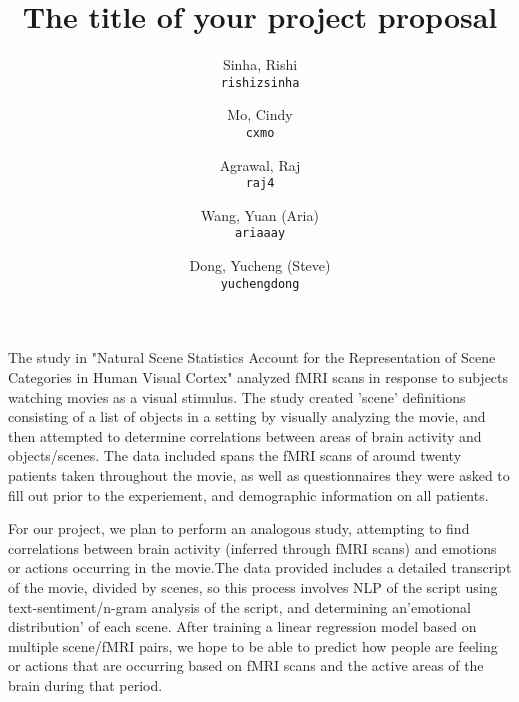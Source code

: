\documentclass[11pt]{article}
\title{The title of your project proposal}
\author{
  Sinha, Rishi\\
  \texttt{rishizsinha}
  \and
  Mo, Cindy\\
  \texttt{cxmo}
  \and
  Agrawal, Raj\\
  \texttt{raj4}
  \and
  Wang, Yuan (Aria)\\
  \texttt{ariaaay}
  \and
  Dong, Yucheng (Steve)\\
  \texttt{yuchengdong}
}
\begin{document}
\maketitle

The study in "Natural Scene Statistics Account for the Representation of 
Scene Categories in Human Visual Cortex"\cite{stansbury2013neuron} analyzed 
fMRI scans in response to subjects watching movies as a visual stimulus.
The study created 'scene' definitions consisting of a list of objects in 
a setting by visually analyzing the movie, and then attempted to determine 
correlations between areas of brain activity and objects/scenes. The data 
included spans the fMRI scans of around twenty patients taken throughout
the movie, as well as questionnaires they were asked to fill out prior
to the experiement, and demographic information on all patients.

For our project, we plan to perform an analogous study, attempting to find
correlations between brain activity (inferred through fMRI scans) and 
emotions or actions occurring in the movie.The data provided includes 
a detailed transcript of the movie, divided by scenes, so this process 
involves NLP of the script using text-sentiment/n-gram analysis of the 
script, and determining an'emotional distribution' of each scene. After 
training a linear regression model based on multiple scene/fMRI pairs, we 
hope to be able to predict how people are feeling or actions that are 
occurring based on fMRI scans and the active areas of the brain during that 
period. 


\end{document}
